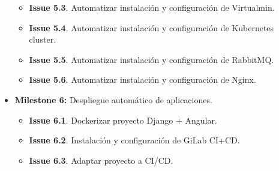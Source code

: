 \begin{text}
\begin{itemize}
\begin{itemize}
					\item \textbf{Issue 5.3}. Automatizar instalación y configuración de Virtualmin.
					\item \textbf{Issue 5.4}. Automatizar instalación y configuración de Kubernetes cluster.
					\item \textbf{Issue 5.5}. Automatizar instalación y configuración de RabbitMQ.
					\item \textbf{Issue 5.6}. Automatizar instalación y configuración de Nginx.
				\end{itemize}
			\item \textbf{Milestone 6:} Despliegue automático de aplicaciones.
				\begin{itemize}
					\item \textbf{Issue 6.1}. Dockerizar proyecto Django + Angular.
					\item \textbf{Issue 6.2}. Instalación y configuración de GiLab CI+CD.
					\item \textbf{Issue 6.3}. Adaptar proyecto a CI/CD.
				\end{itemize}
		\end{itemize}
	\end{text}



		
